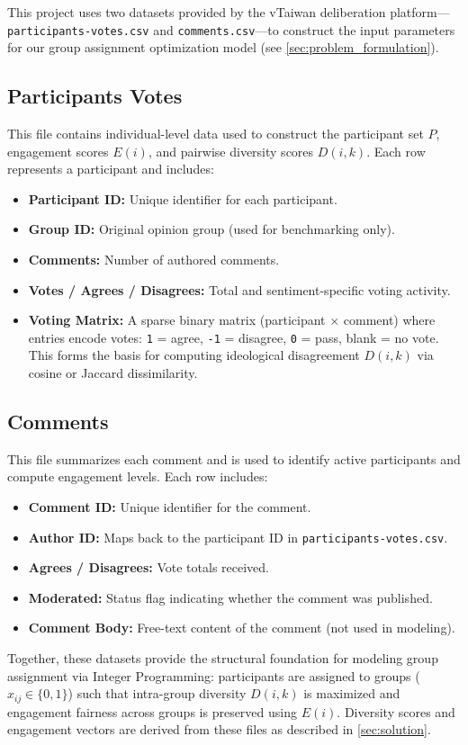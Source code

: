 This project uses two datasets provided by the vTaiwan deliberation platform—\texttt{participants-votes.csv} and \texttt{comments.csv}—to construct the input parameters for our group assignment optimization model (see \cref{sec:problem_formulation}).

\subsection*{Participants Votes}

This file contains individual-level data used to construct the participant set \(P\), engagement scores \(E(i)\), and pairwise diversity scores \(D(i,k)\). Each row represents a participant and includes:
\begin{itemize}
    \item \textbf{Participant ID:} Unique identifier for each participant.
    \item \textbf{Group ID:} Original opinion group (used for benchmarking only).
    \item \textbf{Comments:} Number of authored comments.
    \item \textbf{Votes / Agrees / Disagrees:} Total and sentiment-specific voting activity.
    \item \textbf{Voting Matrix:} A sparse binary matrix (participant $\times$ comment) where entries encode votes: \texttt{1} = agree, \texttt{-1} = disagree, \texttt{0} = pass, blank = no vote. This forms the basis for computing ideological disagreement \(D(i,k)\) via cosine or Jaccard dissimilarity.
\end{itemize}

\subsection*{Comments}

This file summarizes each comment and is used to identify active participants and compute engagement levels. Each row includes:
\begin{itemize}
    \item \textbf{Comment ID:} Unique identifier for the comment.
    \item \textbf{Author ID:} Maps back to the participant ID in \texttt{participants-votes.csv}.
    \item \textbf{Agrees / Disagrees:} Vote totals received.
    \item \textbf{Moderated:} Status flag indicating whether the comment was published.
    \item \textbf{Comment Body:} Free-text content of the comment (not used in modeling).
\end{itemize}

Together, these datasets provide the structural foundation for modeling group assignment via Integer Programming: participants are assigned to groups (\(x_{ij} \in \{0,1\}\)) such that intra-group diversity \(D(i,k)\) is maximized and engagement fairness across groups is preserved using \(E(i)\). Diversity scores and engagement vectors are derived from these files as described in \cref{sec:solution}.
